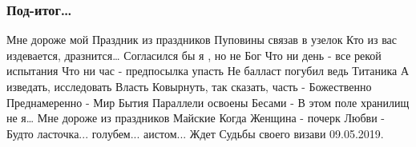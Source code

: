  
 
 

\subsubsection{Под-итог…}

Мне дороже мой Праздник из праздников
Пуповины связав в узелок
Кто из вас издевается, дразнится…
Согласился бы я , но не Бог
Что ни день - все рекой испытания
Что ни час - предпосылка упасть
Не балласт погубил ведь Титаника
А изведать, исследовать Власть
Ковырнуть, так сказать, часть - Божественно
Преднамеренно - Мир Бытия
Параллели освоены Бесами -
В этом поле хранилищ не я…
Мне дороже из праздников Майские
Когда Женщина - почерк Любви -
Будто ласточка... голубем... аистом...
Ждет Судьбы своего визави
09.05.2019. 
